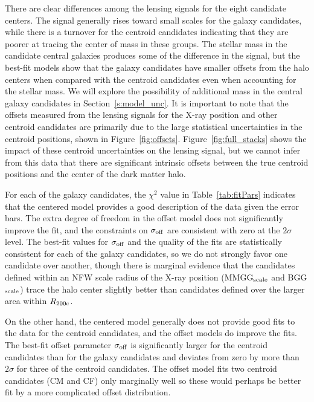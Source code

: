 \documentclass[12pt]{emulateapj}
\begin{document}
There are clear differences among the lensing signals for the eight
candidate centers. The signal generally rises toward small scales for
the galaxy candidates, while there is a turnover for the centroid
candidates indicating that they are poorer at tracing the center of
mass in these groups. The stellar mass in the candidate central
galaxies produces some of the difference in the signal, but the
best-fit models show that the galaxy candidates have smaller offsets
from the halo centers when compared with the centroid candidates even
when accounting for the stellar mass. We will explore the possibility
of additional mass in the central galaxy candidates in
Section~\ref{s:model_unc}. It is important to note that the offsets
measured from the lensing signals for the X-ray position and other
centroid candidates are primarily due to the large statistical
uncertainties in the centroid positions, shown in
Figure~\ref{fig:offsets}. Figure~\ref{fig:full_stacks} shows the
impact of these centroid uncertainties on the lensing signal, but we
cannot infer from this data that there are significant intrinsic
offsets between the true centroid positions and the center of the dark
matter halo.

For each of the galaxy candidates, the $\chi^2$ value
  in Table~\ref{tab:fitPars} indicates that the centered model
  provides a good description of the data given the error bars. The
  extra degree of freedom in the offset model does not significantly
  improve the fit, and the constraints on $\sigma_{\rm off}$ are
  consistent with zero at the $2\sigma$ level. The best-fit values for
  $\sigma_{\rm off}$ and the quality of the fits are statistically
  consistent for each of the galaxy candidates, so we do not strongly
  favor one candidate over another, though there is marginal evidence
  that the candidates defined within an NFW scale radius of the X-ray
  position (MMGG$_{\rm scale}$ and BGG$_{\rm scale}$) trace the halo
  center slightly better than candidates defined over the larger area
  within $R_{\rm 200c}$.
 
On the other hand, the centered model generally does not provide good
fits to the data for the centroid candidates, and the offset models do
improve the fits. The best-fit offset parameter
  $\sigma_{\rm off}$ is significantly larger for the centroid candidates than for the galaxy
  candidates and deviates from zero by more than $2\sigma$ for three
  of the centroid candidates. The offset model fits
  two centroid candidates (CM and CF) only marginally well so these
would perhaps be better fit by a more complicated offset distribution.
\end{document}
